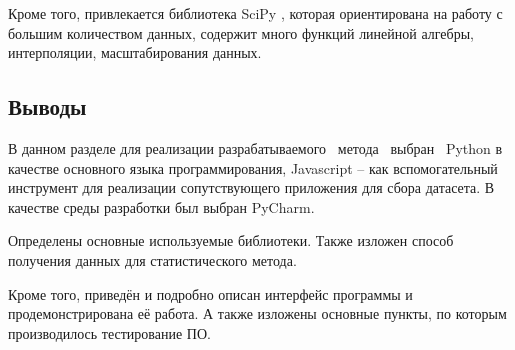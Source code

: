 Кроме того, привлекается библиотека SciPy \cite{scipy}, которая ориентирована на работу с большим количеством данных, содержит много функций линейной алгебры, интерполяции, масштабирования данных. \newline

\subsection*{Выводы}
В данном разделе для реализации разрабатываемого \, метода \, выбран \, Python в качестве основного языка программирования, Javascript -- как вспомогательный инструмент для реализации сопутствующего приложения для сбора датасета. В качестве среды разработки был выбран PyCharm.

Определены основные используемые библиотеки. Также изложен способ получения данных для статистического метода.

Кроме того, приведён и подробно описан интерфейс программы и продемонстрирована её работа. А также изложены основные пункты, по которым производилось тестирование ПО.
\pagebreak